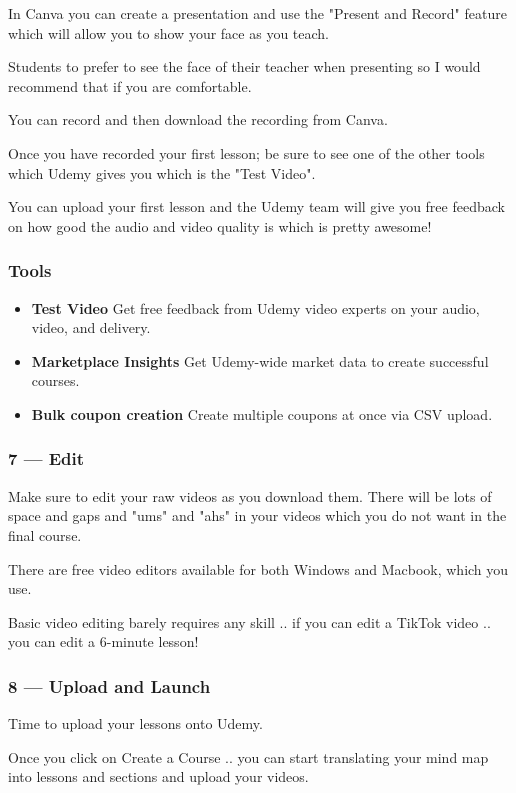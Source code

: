 \documentclass[11pt]{article}
\begin{document}
In Canva you can create a presentation and use the "Present and Record" feature which will allow you to show your face as you teach.

Students to prefer to see the face of their teacher when presenting so I would recommend that if you are comfortable.

You can record and then download the recording from Canva.

Once you have recorded your first lesson; be sure to see one of the other tools which Udemy gives you which is the "Test Video".

You can upload your first lesson and the Udemy team will give you free feedback on how good the audio and video quality is which is pretty awesome!

\subsubsection*{Tools}
\begin{itemize}
\item \textbf{Test Video} Get free feedback from Udemy video experts on your audio, video, and delivery.
\item \textbf{Marketplace Insights} Get Udemy-wide market data to create successful courses.
\item \textbf{Bulk coupon creation} Create multiple coupons at once via CSV upload.
\end{itemize}

\subsubsection*{7 — Edit}
Make sure to edit your raw videos as you download them. There will be lots of space and gaps and "ums" and "ahs" in your videos which you do not want in the final course.

There are free video editors available for both Windows and Macbook, which you use.

Basic video editing barely requires any skill .. if you can edit a TikTok video .. you can edit a 6-minute lesson!

\subsubsection*{8 — Upload and Launch}
Time to upload your lessons onto Udemy.

Once you click on Create a Course .. you can start translating your mind map into lessons and sections and upload your videos.
\end{document}
